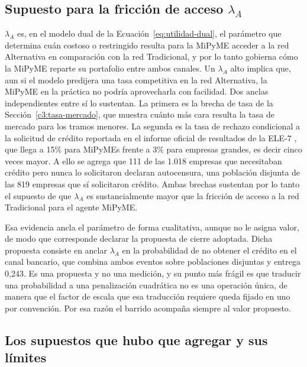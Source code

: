 \subsection[Supuesto para la fricción de acceso lambda A]{Supuesto para la fricción de acceso $\lambda_A$}
\label{c3:supuesto-lambda}

$\lambda_A$ es, en el modelo dual de la Ecuación~\eqref{eq:utilidad-dual}, el parámetro que determina cuán costoso o restringido resulta para la MiPyME acceder a la red Alternativa en comparación con la red Tradicional, y por lo tanto gobierna cómo la MiPyME reparte su portafolio entre ambos canales. Un $\lambda_A$ alto implica que, aun si el modelo predijera una tasa competitiva en la red Alternativa, la MiPyME en la práctica no podría aprovecharla con facilidad. Dos anclas independientes entre sí lo sustentan. La primera es la brecha de tasa de la Sección~\ref{c3:tasa-mercado}, que muestra cuánto más cara resulta la tasa de mercado para los tramos menores. La segunda es la tasa de rechazo condicional a la solicitud de crédito reportada en el informe oficial de resultados de la ELE-7 \cite{ele7_informe_2024}, que llega a 15\% para MiPyMEs frente a 3\% para empresas grandes, es decir cinco veces mayor. A ello se agrega que 111 de las 1.018 empresas que necesitaban crédito pero nunca lo solicitaron declaran autocensura, una población disjunta de las 819 empresas que sí solicitaron crédito. Ambas brechas sustentan por lo tanto el supuesto de que $\lambda_A$ es sustancialmente mayor que la fricción de acceso a la red Tradicional para el agente MiPyME.

Esa evidencia ancla el parámetro de forma cualitativa, aunque no le asigna valor, de modo que corresponde declarar la propuesta de cierre adoptada. Dicha propuesta consiste en anclar $\lambda_A$ en la probabilidad de no obtener el crédito en el canal bancario, que combina ambos eventos sobre poblaciones disjuntas y entrega 0,243. Es una propuesta y no una medición, y su punto más frágil es que traducir una probabilidad a una penalización cuadrática no es una operación única, de manera que el factor de escala que esa traducción requiere queda fijado en uno por convención. Por esa razón el barrido acompaña siempre al valor propuesto.

\subsection{Los supuestos que hubo que agregar y sus límites}
\label{c3:supuestos-modulo}

